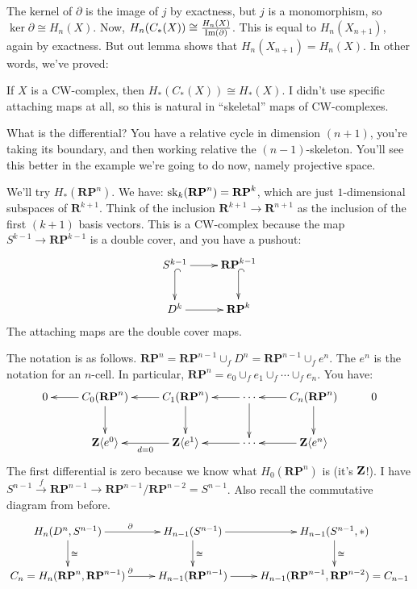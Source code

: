 The kernel of $\partial$ is the image of $j$ by exactness, but $j$ is a monomorphism, so $\ker\partial\cong H_n(X)$. Now, $ H_n(C_\ast(X))\cong\frac{ H_n(X)}{\operatorname{Im}(\partial)}$. This is equal to $ H_n(X_{n+1})$, again by exactness. But out lemma shows that $ H_n(X_{n+1})= H_n(X)$. In other words, we've proved:
\begin{theorem}
If $X$ is a CW-complex, then $ H_\ast(C_\ast(X))\cong H_\ast(X)$. I didn't use specific attaching maps at all, so this is natural in ``skeletal'' maps of CW-complexes.
\end{theorem}
What is the differential? You have a relative cycle in dimension $(n+1)$, you're taking its boundary, and then working relative the $(n-1)$-skeleton. You'll see this better in the example we're going to do now, namely projective space.
\begin{example}
We'll try $ H_\ast(\mathbf{RP}^n)$. We have: $\mathrm{sk}_k(\mathbf{RP}^n)=\mathbf{RP}^k$, which are just $1$-dimensional subspaces of $\mathbf{R}^{k+1}$. Think of the inclusion $\mathbf{R}^{k+1}\to\mathbf{R}^{n+1}$ as the inclusion of the first $(k+1)$ basis vectors. This is a CW-complex because the map $S^{k-1}\to \mathbf{RP}^{k-1}$ is a double cover, and you have a pushout:
\begin{equation*}
\xymatrix{S^{k-1}\ar[r]\ar@{^(->}[d] & \mathbf{RP}^{k-1}\ar@{^(->}[d]\\
D^k\ar[r] & \mathbf{RP}^k}
\end{equation*}
The attaching maps are the double cover maps.
\end{example}
The notation is as follows. $\mathbf{RP}^n=\mathbf{RP}^{n-1}\cup_f D^n=\mathbf{RP}^{n-1}\cup_f e^n$. The $e^n$ is the notation for an $n$-cell. In particular, $\mathbf{RP}^n=e_0\cup_f e_1\cup_f\cdots\cup_f e_n$. You have:
\begin{equation*}
\xymatrix{0 & C_0(\mathbf{RP}^n)\ar[d]\ar[l] & C_1(\mathbf{RP}^n)\ar[d]\ar[l] & \cdots\ar[l]\ar[d] & C_n(\mathbf{RP}^n)\ar[d]\ar[l] & 0\\
& \Z\langle e^0\rangle & \Z\langle e^1\rangle\ar[l]^{d=0} & \cdots\ar[l] & \Z\langle e^n\rangle\ar[l]}
\end{equation*}
The first differential is zero because we know what $ H_0(\mathbf{RP}^n)$ is (it's $\mathbf Z$!). I have $S^{n-1}\xrightarrow{f}\mathbf{RP}^{n-1}\to \mathbf{RP}^{n-1}/\mathbf{RP}^{n-2}=S^{n-1}$. Also recall the commutative diagram from before.
\begin{equation*}
\xymatrix{ H_n(D^n,S^{n-1})\ar[r]^\partial \ar[d]^\cong & H_{n-1}(S^{n-1})\ar[r]\ar[d]^\cong & H_{n-1}(S^{n-1},\ast)\ar[d]^\cong\\
C_n= H_n(\mathbf{RP}^n,\mathbf{RP}^{n-1})\ar[r]^\partial & H_{n-1}(\mathbf{RP}^{n-1}) \ar[r] & H_{n-1}(\mathbf{RP}^{n-1},\mathbf{RP}^{n-2})=C_{n-1}
}
\end{equation*}
